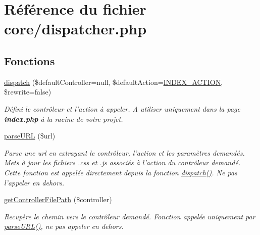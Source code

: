 \hypertarget{dispatcher_8php}{\section{Référence du fichier core/dispatcher.php}
\label{dispatcher_8php}
}
\subsection*{Fonctions}
\begin{DoxyCompactItemize}
\item 
\hyperlink{dispatcher_8php_ae983faa34cafdcccc76bb81647d10d72}{dispatch} (\$default\-Controller=null, \$default\-Action=\hyperlink{config_8php_a57597912779f7a405b4930ca59fbbb8e}{I\-N\-D\-E\-X\-\_\-\-A\-C\-T\-I\-O\-N}, \$rewrite=false)
\begin{DoxyCompactList}\small\item\em Défini le contrôleur et l'action à appeler. A utiliser uniquement dans la page {\bfseries index.\-php} à la racine de votre projet. \end{DoxyCompactList}\item 
\hyperlink{dispatcher_8php_ac8975bde247e471a5a6441be370de10b}{parse\-U\-R\-L} (\$url)
\begin{DoxyCompactList}\small\item\em Parse une url en extrayant le contrôleur, l'action et les paramètres demandés. Mets à jour les fichiers .css et .js associés à l'action du contrôleur demandé. Cette fonction est appelée directement depuis la fonction \hyperlink{dispatcher_8php_ae983faa34cafdcccc76bb81647d10d72}{dispatch()}. Ne pas l'appeler en dehors. \end{DoxyCompactList}\item 
\hyperlink{dispatcher_8php_a313bca01e64a3f4ab9ed872828e1af0f}{get\-Controller\-File\-Path} (\$controller)
\begin{DoxyCompactList}\small\item\em Recupère le chemin vers le contrôleur demandé. Fonction appelée uniquement par \hyperlink{dispatcher_8php_ac8975bde247e471a5a6441be370de10b}{parse\-U\-R\-L()}, ne pas appeler en dehors. \end{DoxyCompactList}\end{DoxyCompactItemize}


